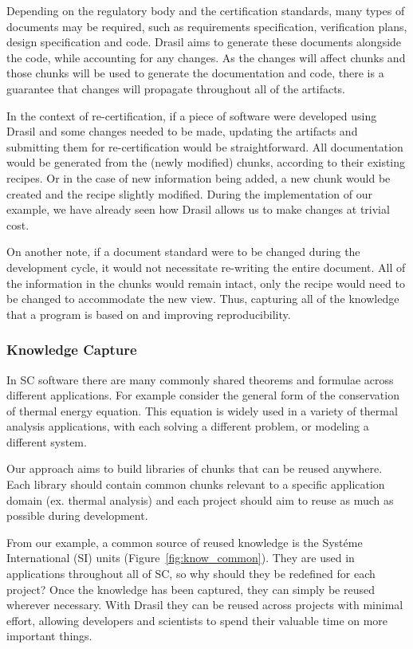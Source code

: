 \documentclass{sig-alternate-05-2015}
\newcommand{\lss}{Drasil}
\begin{document}
Depending on the regulatory body and the certification standards, many
types of documents may be required, such as requirements specification,
verification plans, design specification and code. \lss{} aims to generate these
documents alongside the code, while accounting for any changes. As the changes
will affect chunks and those chunks will be used to generate the documentation
and code, there is a guarantee that changes will propagate throughout all of the
artifacts.

In the context of re-certification, if a piece of software were developed using
\lss{} and some changes needed to be made, updating the artifacts and submitting
them for re-certification would be straightforward. All documentation would be
generated from the (newly modified) chunks, according to their existing recipes.
Or in the case of new information being added, a new chunk would be created and
the recipe slightly modified. During the implementation of our example, we have
already seen how \lss{} allows us to make changes at trivial cost.

On another note, if a document standard were to be changed during the
development cycle, it would not necessitate re-writing the entire document. All
of the information in the chunks would remain intact, only the recipe would need
to be changed to accommodate the new view. Thus, capturing all of the knowledge
that a program is based on and improving reproducibility.

\subsubsection{Knowledge Capture} \label{sssec:adv_knowledge}

In SC software there are many commonly shared theorems and formulae across
different applications. For example consider the general form of the
conservation of thermal energy equation. This equation is widely used in a
variety of thermal analysis applications, with each solving a different problem,
or modeling a different system.

Our approach aims to build libraries of chunks that can be reused anywhere. Each
library should contain common chunks relevant to a specific application domain
(ex. thermal analysis) and each project should aim to reuse as much as possible
during development.

From our example, a common source of reused knowledge is the Syst\'{e}me
International (SI) units (Figure~\ref{fig:know_common}). They are used in
applications throughout all of SC, so why should they be redefined for each
project? Once the knowledge has been captured, they can simply be reused
wherever necessary. With \lss{} they can be reused across projects with minimal
effort, allowing developers and scientists to spend their valuable time on more
important things.
\end{document}
